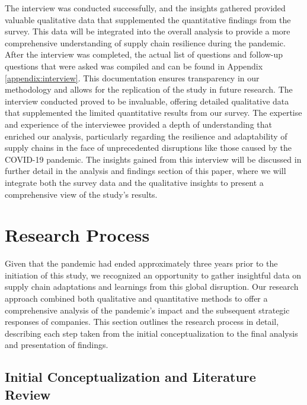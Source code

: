 The interview was conducted successfully, and the insights gathered provided valuable qualitative data that supplemented the quantitative findings from the survey. This data will be integrated into the overall analysis to provide a more comprehensive understanding of supply chain resilience during the pandemic. After the interview was completed, the actual list of questions and follow-up questions that were asked was compiled and can be found in Appendix \ref{appendix:interview}. This documentation ensures transparency in our methodology and allows for the replication of the study in future research. The interview conducted proved to be invaluable, offering detailed qualitative data that supplemented the limited quantitative results from our survey. The expertise and experience of the interviewee provided a depth of understanding that enriched our analysis, particularly regarding the resilience and adaptability of supply chains in the face of unprecedented disruptions like those caused by the COVID-19 pandemic. The insights gained from this interview will be discussed in further detail in the analysis and findings section of this paper, where we will integrate both the survey data and the qualitative insights to present a comprehensive view of the study's results.


\section{Research Process}

Given that the pandemic had ended approximately three years prior to the initiation of this study, we recognized an opportunity to gather insightful data on supply chain adaptations and learnings from this global disruption. Our research approach combined both qualitative and quantitative methods to offer a comprehensive analysis of the pandemic's impact and the subsequent strategic responses of companies. This section outlines the research process in detail, describing each step taken from the initial conceptualization to the final analysis and presentation of findings.

\subsection{Initial Conceptualization and Literature Review}

